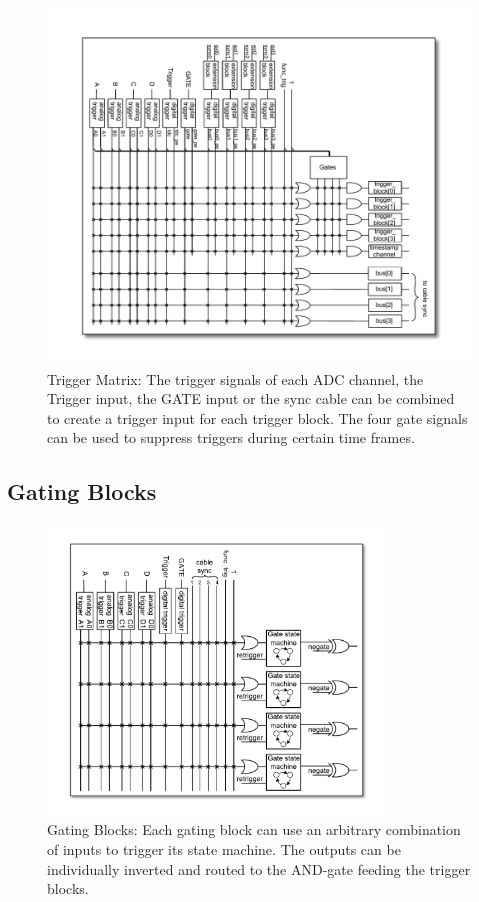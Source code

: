 \begin{figure}
    \centering
    \includegraphics[width=\textwidth]{figures/triggermatrix.pdf}
    \caption{Trigger Matrix: The trigger signals of each ADC channel, the Trigger input, the GATE input or the sync cable can be combined to create a trigger input for each trigger block.  The four gate signals can be used to suppress triggers during certain time frames.\label{fig:triggermatrix}}
\end{figure}

\subsection{Gating Blocks}

        \begin{figure}[ht]
            \begin{center}
                \includegraphics[width=0.8\textwidth]{figures/GatingBlocks.pdf}
                \caption{\label{fig:GatingBlock} Gating Blocks: Each gating block can use an arbitrary combination of inputs to trigger its state machine. The outputs can be individually inverted and routed to the AND-gate feeding the trigger blocks.}
            \end{center}
        \end{figure}

